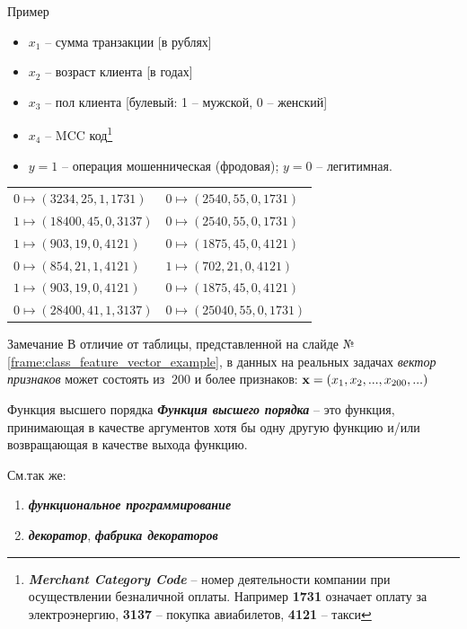 \documentclass{beamer}
\newcommand{\termdef}[1]{\textbf{\textit{#1}}}
\newcommand{\term}{\textit}
\begin{document}
  \begin{frame}{Пример}\label{frame:class_feature_vector_example}
  \begin{itemize}
  	 \item $x_1$ -- сумма транзакции [в рублях]
  	 \item $x_2$ -- возраст клиента [в годах]
  	 \item $x_3$ -- пол клиента [булевый: 1 -- мужской, 0 -- женский]
  	 \item $x_4$ -- MCC код\footnote{\termdef{Merchant Category Code} -- номер деятельности компании при осуществлении безналичной оплаты. Например \textbf{1731} означает оплату за электроэнергию, \textbf{3137} -- покупка авиабилетов, \textbf{4121} -- такси}
  	 \item  $y=1$ -- операция мошенническая (фродовая);  $y=0$ -- легитимная.
  \end{itemize}
  \begin{center}\small \begin{tabular}{ l l }
  	$0 \mapsto (3234, 25, 1, 1731) $ &  $0 \mapsto (2540, 55, 0, 1731)$ \\
  	$1 \mapsto (18400, 45, 0, 3137)$ & $0 \mapsto (2540, 55, 0, 1731)$  \\
  	$1 \mapsto (903, 19, 0, 4121)$  & $0 \mapsto (1875, 45, 0, 4121)$  \\
  	$0 \mapsto (854, 21, 1, 4121)$  & $1 \mapsto (702, 21, 0, 4121)$  \\
  	$1 \mapsto (903, 19, 0, 4121)$  & $0 \mapsto (1875, 45, 0, 4121)$  \\
  	$0 \mapsto (28400, 41, 1, 3137)$ & $0 \mapsto (25040, 55, 0, 1731)$  \\
  \end{tabular}\end{center}
  \end{frame}
  
  \begin{frame}
   \begin{block}{Замечание}
	  В отличие от таблицы, представленной на слайде №\ref{frame:class_feature_vector_example},
	  в данных на реальных задачах \term{вектор признаков} может состоять из $~200$ и более признаков:
	  $\bold x = (x_1, x_2, ..., x_{200}, ...)$
  \end{block}
  \end{frame}
  
  \begin{frame}{Функция высшего порядка}
  \termdef{Функция высшего порядка} -- это функция, принимающая в качестве аргументов хотя бы одну другую функцию и/или возвращающая в качестве выхода функцию.
  
  См.так же:
  \begin{enumerate}
  	\item \termdef{функциональное программирование}
  	\item \termdef{декоратор}, \termdef{фабрика декораторов}
  \end{enumerate}
  
  \end{frame}
  
\end{document}
